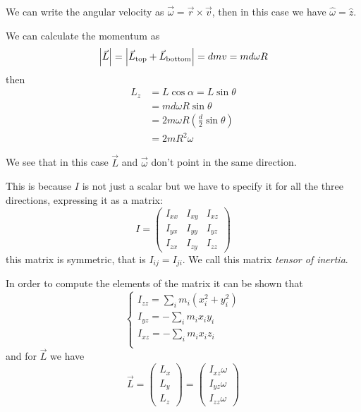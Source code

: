 \documentclass[12pt]{extarticle}
\begin{document}
We can write the angular velocity as $\vec{\omega} = \vec{r} \times \vec{v}$, then in this case we have $\hat \omega = \hat z$.

We can calculate the momentum as
\begin{equation}
    \abs{\vec L} = \abs{\vec{L}_{\text{top}} + \vec{L}_{\text{bottom}}} = dmv = md\omega R
\end{equation}
then
\begin{align}
    L_z & = L \cos \alpha = L \sin \theta                       \\
        & = md\omega R \sin \theta                              \\
        & = 2 m \omega R \left( \frac{d}{2} \sin \theta \right) \\
        & = 2m R^2 \omega
\end{align}

We see that in this case $\vec{L}$ and $\vec{\omega}$ don't point in the same direction.

This is because $I$ is not just a scalar but we have to specify it for all the three directions, expressing it as a matrix:
\begin{equation}
    I = \begin{pmatrix}
        I_{xx} & I_{xy} & I_{xz} \\
        I_{yx} & I_{yy} & I_{yz} \\
        I_{zx} & I_{zy} & I_{zz}
    \end{pmatrix}
\end{equation}
this matrix is symmetric, that is $I_{ij} = I_{ji}$. We call this matrix \emph{tensor of inertia}.

In order to compute the elements of the matrix it can be shown that
\begin{equation}
    \begin{cases}
        I_{zz} = \sum_i m_i (x_i^2 + y_i^2) \\
        I_{yz} = - \sum_i m_i x_i y_i       \\
        I_{xz} = - \sum_i m_i x_i z_i       \\
    \end{cases}
\end{equation}
and for $\vec{L}$ we have
\begin{equation}
    \vec{L} = \begin{pmatrix}
        L_x \\
        L_y \\
        L_z
    \end{pmatrix}
    =
    \begin{pmatrix}
        I_{xz} \omega \\
        I_{yz} \omega \\
        I_{zz} \omega
    \end{pmatrix}
\end{equation}
\end{document}
